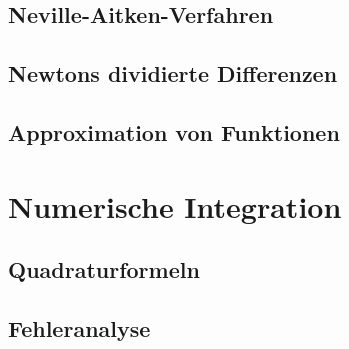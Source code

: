\subsection{Neville-Aitken-Verfahren}
\subsection{Newtons dividierte Differenzen}
\subsection{Approximation von Funktionen}

\section{Numerische Integration}
\subsection{Quadraturformeln}
\subsection{Fehleranalyse}
\clearpage